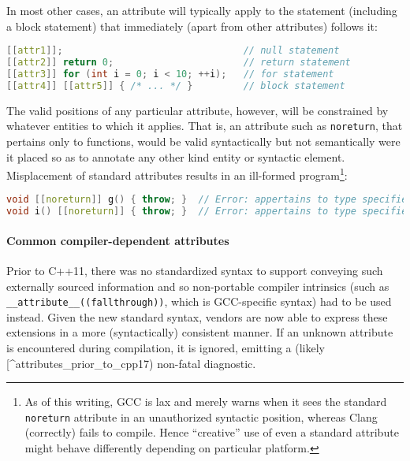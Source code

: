 \documentclass[twoside,10pt,letterpaper,usenames]{newstyle-PearsonGeneric-7-38}
\begin{document}
In most other cases, an attribute will typically apply to the statement
(including a block statement) that immediately (apart from other
attributes) follows it:

\begin{lstlisting}[language=C++, caption={missing caption}, label={testlabel}, frame=tb]
[[attr1]];                                // null statement
[[attr2]] return 0;                       // return statement
[[attr3]] for (int i = 0; i < 10; ++i);   // for statement
[[attr4]] [[attr5]] { /* ... */ }         // block statement
\end{lstlisting}
    

The valid positions of any particular attribute, however, will be
constrained by whatever entities to which it applies. That is, an
attribute such as \texttt{noreturn}, that pertains only to functions,
would be valid syntactically but not semantically were it placed so as
to annotate any other kind entity or syntactic element. Misplacement of
standard attributes results in an ill-formed
program{\cprotect\footnote{As of this writing, GCC is lax and merely
  warns when it sees the standard \texttt{noreturn} attribute in an
  unauthorized syntactic position, whereas Clang (correctly) fails to
  compile. Hence ``creative'' use of even a standard attribute might
  behave differently depending on particular platform.}}:

\begin{lstlisting}[language=C++, caption={missing caption}, label={testlabel}, frame=tb]
void [[noreturn]] g() { throw; }  // Error: appertains to type specifier
void i() [[noreturn]] { throw; }  // Error: appertains to type specifier
\end{lstlisting}
    

\paragraph[Common compiler-dependent attributes]{Common compiler-dependent attributes}\label{common-compiler-dependent-attributes}

Prior to C++11, there was no standardized syntax to support conveying
such externally sourced information and so non-portable compiler
intrinsics (such as \texttt{\_\_attribute\_\_((fallthrough))}, which is
GCC-specific syntax) had to be used instead. Given the new standard
syntax, vendors are now able to express these extensions in a more
(syntactically) consistent manner. If an unknown attribute is
encountered during compilation, it is ignored, emitting a (likely
{[}\^{}attributes\_prior\_to\_cpp17) non-fatal diagnostic.
\end{document}
